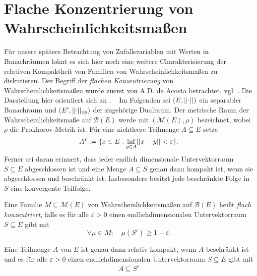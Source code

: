 \section{Flache Konzentrierung von Wahrscheinlichkeitsmaßen}
Für unsere spätere Betrachtung von Zufallsvariablen mit Werten in Banachräumen lohnt es sich hier noch eine weitere Charakterisierung der relativen Kompaktheit von Familien von Wahrscheinlichkeitsmaßen zu diskutieren. 
Der Begriff der \textit{flachen Konzentrierung} von Wahrscheinlichkeitsmaßen wurde zuerst von A.D. de Acosta betrachtet, vgl. \cite{acosta}. 
Die Darstellung hier orientiert sich an \cite{vakhania}. 
\newline \ \newline 
Im Folgenden sei $(E, \lvert\lvert \cdot \rvert\rvert)$ ein separabler Banachraum und $(E', \lvert\lvert \cdot \rvert\rvert_{op})$ der zugehörige Dualraum. Der metrische Raum der Wahrscheinlichkeitsmaße auf $\mathcal{B}(E)$ werde mit $(\mathcal{M}(E), \rho)$ bezeichnet, wobei 
$\rho$ die Prokhorov-Metrik ist. Für eine nichtleere Teilmenge $A \subseteq E$ setze 
$$
    A^{\varepsilon} := \{x \in E: \inf_{y\in A}\lvert\lvert x-y \rvert\rvert < \varepsilon \}.
$$
Ferner sei daran erinnert, dass jeder endlich dimensionale Untervektorraum  $S \subseteq E$ abgeschlossen ist und eine Menge $A \subseteq S$ genau dann kompakt ist, wenn sie abgeschlossen und beschränkt ist. 
Insbesondere besitzt jede beschränkte Folge in $S$ eine konvergente Teilfolge. 
\begin{mydef}
    Eine Familie $M \subseteq \mathcal{M}(E)$ von Wahrscheinlichkeitsmaßen auf $\mathcal{B}(E)$ heißt \textit{flach konzentriert}, falls es für alle $\varepsilon > 0$ einen endlichdimensionalen 
    Untervektorraum $S \subseteq E$ gibt mit 
    $$
        \forall \mu \in M: \quad \mu(S^{\varepsilon}) \geq 1 - \varepsilon.
    $$ 
\end{mydef}

\begin{lemma}
    Eine Teilmenge $A$ von $E$ ist genau dann relativ kompakt, wenn $A$ beschränkt ist und es für alle $\varepsilon > 0$ einen endlichdimensionalen Untervektorraum $S \subseteq E$ gibt mit 
    \begin{align*}
        A \subseteq S^{\varepsilon}
    \end{align*}
\end{lemma}

